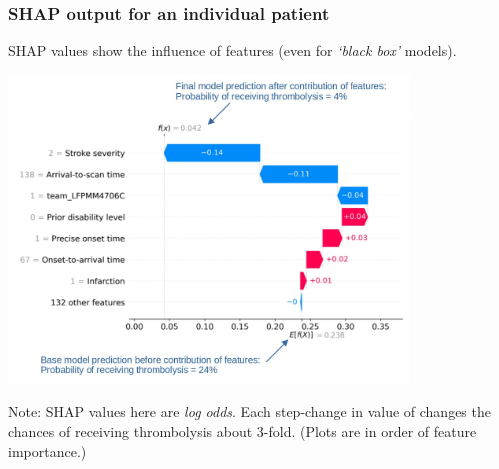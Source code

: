 \documentclass[xcolor={usenames,dvipsnames}]{beamer}
\begin{document}

\begin{frame}
\frametitle{SHAP output for an individual patient}


SHAP values show the influence of features (even for \emph{`black box'} models).

\begin{center} 
\includegraphics[width=0.8\textwidth]{./images/shap_output_for_individual_patient}
\end{center}

\vspace{-0.8em}
\tiny{Note: SHAP values here are \emph{log odds}. Each step-change in value of  changes the chances of receiving thrombolysis about 3-fold. (Plots are in order of feature importance.)}

\end{frame}



\end{document}
